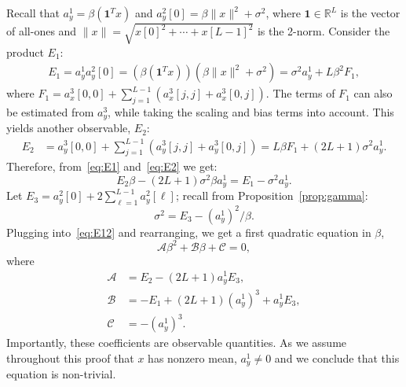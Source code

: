 \documentclass[12pt]{article}
\newcommand{\1}{\mathbf{1}}
\newcommand{\RL}{\mathbb{R}^L}
\newcommand{\one}{\mathbf{1}}
\theoremstyle{plain}
\theoremstyle{definition}
\theoremstyle{remark}
\theoremstyle{plain}
\theoremstyle{remark}
\theoremstyle{plain}
\theoremstyle{plain}
\theoremstyle{plain}
\numberwithin{equation}{section}
\begin{document}
Recall that $a_y^1 = \beta(\one^Tx)$ and $a_y^2[0] = \beta\|x\|^2+\sigma^2$, where $\one\in\RL$ is the vector of all-ones and $\|x\|=\sqrt{x[0]^2 + \cdots + x[L-1]^2}$ is the 2-norm. Consider the product $E_1$:
\begin{equation}\label{eq:E1}
\begin{split}
E_1 = a_y^1a_y^2[0] =  (\beta(\one^Tx))(\beta\|x\|^2+\sigma^2)  = \sigma^2a_y^1 + L\beta^2F_1,
\end{split}
\end{equation}
where $F_1 = a_x^3[0,0] + \sum_{j=1}^{L-1}(a_x^3[j,j] + a_x^3[0,j])$. 
The terms of $F_1$ can also be estimated from $a_y^3$, while taking the scaling and bias terms into account. This yields another observable, $E_2$:
\begin{align} 
E_2 & = a_y^3[0,0] + \sum_{j=1}^{L-1}(a_y^3[j,j] + a_y^3[0,j]) = L\beta F_1 + (2L+1)\sigma^2a_y^1. \label{eq:E2}
\end{align}
Therefore, from~\eqref{eq:E1} and~\eqref{eq:E2} we get:
\begin{equation} \label{eq:E12}
E_2\beta -(2L+1)\sigma^2\beta a_y^1 = E_1-\sigma^2a_y^1.
\end{equation}
Let $E_3 =a_y^2[0] + 2\sum_{\ell = 1}^{L-1}a_y^2[\ell]$; recall from Proposition~\ref{prop:gamma}:
\begin{equation} \label{eq:sigma2}
\sigma^2 = E_3 - (a^1_y)^2/\beta. 
\end{equation} 
Plugging into~\eqref{eq:E12} and rearranging, we get a first quadratic equation in $\beta$,
\begin{equation} \label{eq:quad1}
\mathcal{A}\beta^2 + \mathcal{B}\beta + \mathcal{C} = 0,
\end{equation}
where 
\begin{align*}
\mathcal{A} &= E_2 - (2L+1)a_y^1E_3, \\ 
\mathcal{B} &= -E_1 + (2L+1)(a_y^1)^3 + a_y^1E_3  , \\
\mathcal{C} &= -(a_y^1)^3.
\end{align*}
Importantly, these coefficients are observable quantities. As we assume throughout this proof that $x$ has nonzero mean, $a_y^1 \neq 0$ and we conclude that this equation is non-trivial.
\end{document}
